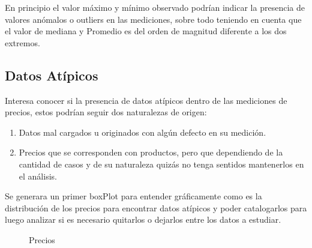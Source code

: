 En principio el valor máximo y mínimo observado podrían indicar la presencia de valores anómalos o outliers en las mediciones, sobre todo teniendo en cuenta que el valor de mediana y Promedio es del orden de magnitud diferente a los dos extremos.


\subsection{Datos Atípicos}

Interesa conocer si la presencia de datos atípicos dentro de las mediciones de precios, estos podrían seguir dos naturalezas de origen:

\begin{enumerate}
    \item Datos mal cargados u originados con algún defecto en su medición.
    \item Precios que se corresponden con productos, pero que dependiendo de la cantidad de casos y de su naturaleza quizás no tenga sentidos mantenerlos en el análisis.
\end{enumerate}


Se generara un primer boxPlot para entender gráficamente como es la distribución de los precios para encontrar datos atípicos y poder catalogarlos para luego analizar si es necesario quitarlos o dejarlos entre los datos a estudiar.

\begin{figure}[h]
\centering
{}%
\caption{Precios}
\label{boxplot}
\end{figure}




